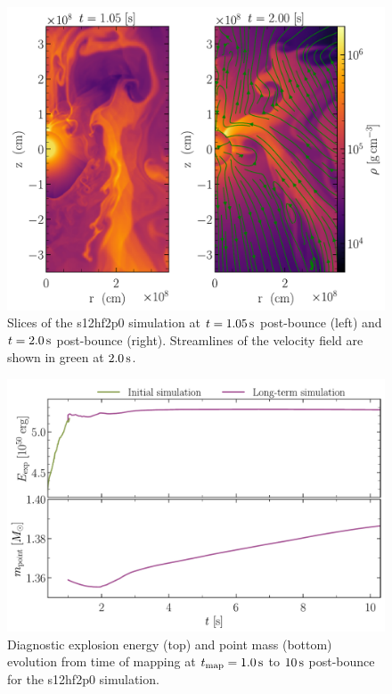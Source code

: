 \begin{figure}
    \centering
    \includegraphics[width=1.0\linewidth]{figures/s12hf2p0_slice.pdf}
    \caption{Slices of the s12hf2p0 simulation at \(t=1.05\,\mathrm{s}\) post-bounce (left) and \(t=2.0\,\mathrm{s}\) post-bounce (right). Streamlines of the velocity field are shown in green at \(2.0\,\mathrm{s}\).}
    \label{fig:s12hf2p0_slice}
\end{figure}

\begin{figure}
    \centering
    \includegraphics[width=0.9\linewidth]{figures/s12hf2p0_quantities.pdf}
    \caption{Diagnostic explosion energy (top) and point mass (bottom) evolution from time of mapping at \(t_\mathrm{map} = 1.0 \,\mathrm{s}\) to \(10\,\mathrm{s}\) post-bounce for the s12hf2p0 simulation.}
    \label{fig:s12hf2p0_quantities}
\end{figure}

